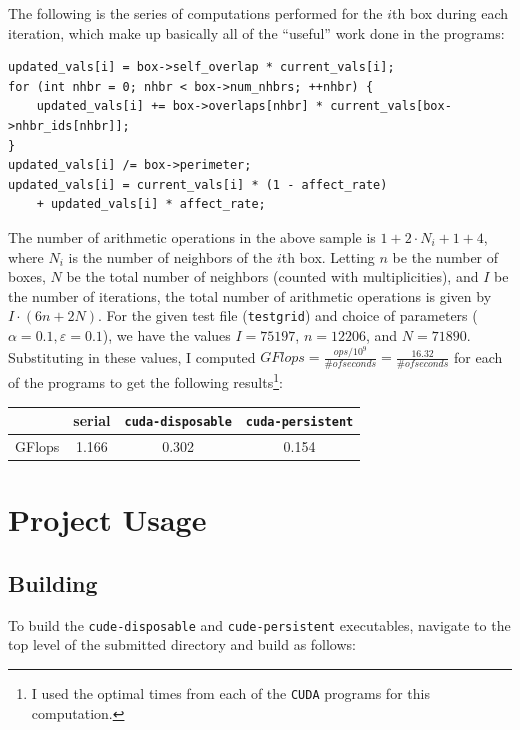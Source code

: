 \documentclass{article}
\begin{document}
\pagebreak
The following is the series of computations performed for the $i$th box during each iteration,
which make up basically all of the ``useful'' work done in the programs:

\begin{lstlisting}[style=DOS]
updated_vals[i] = box->self_overlap * current_vals[i];
for (int nhbr = 0; nhbr < box->num_nhbrs; ++nhbr) {
    updated_vals[i] += box->overlaps[nhbr] * current_vals[box->nhbr_ids[nhbr]];
}
updated_vals[i] /= box->perimeter;
updated_vals[i] = current_vals[i] * (1 - affect_rate)
    + updated_vals[i] * affect_rate;
\end{lstlisting}

The number of arithmetic operations in the above sample is $1 + 2 \cdot N_i + 1 + 4$, where
$N_i$ is the number of neighbors of the $i$th box. Letting $n$ be the number of boxes,
$N$ be the total number of neighbors (counted with multiplicities), and $I$ be the number of iterations,
the total number of arithmetic operations is given by $I\cdot (6n + 2N)$. For the given test file
(\texttt{testgrid}) and choice of
parameters ($\alpha=0.1, \varepsilon=0.1$), we have the values $I=75197$, $n=12206$, and $N=71890$.
Substituting in these values, I computed $GFlops = \frac{ops / 10^9}{\# of seconds} = \frac{16.32}{\# of seconds}$
for each of the programs to get the following results\footnote{I
used the optimal times from each of the \texttt{CUDA} programs for this computation.}:

\begin{center}
\begin{tabular}{|c|c|c|c|}
\cline{2-4}
\multicolumn{1}{c|}{} & serial & \texttt{cuda-disposable} & \texttt{cuda-persistent} \\
\hline
GFlops & 1.166 & 0.302 & 0.154 \\
\hline
\end{tabular}
\end{center}

\section*{Project Usage}
\label{sec:project}

\subsection*{Building}
\label{subsec:building}

To build the \texttt{cude-disposable} and \texttt{cude-persistent} executables, navigate
to the top level of the submitted directory and build as follows:
\end{document}
